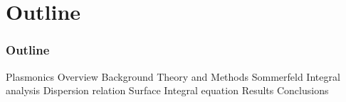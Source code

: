 \documentclass[mathserif,18pt,xcolor=table,c]{beamer}
\begin{document}
\section{Outline}
\begin{frame}
  \frametitle{Outline}
  \begin{outline}[itemize]
    \1 Plasmonics Overview
    \1 Background
    \1 Theory and Methods
      \2 Sommerfeld Integral analysis
      \2 Dispersion relation
      \2 Surface Integral equation
    \1 Results
    \1 Conclusions
  \end{outline}
\end{frame}
\end{document}

